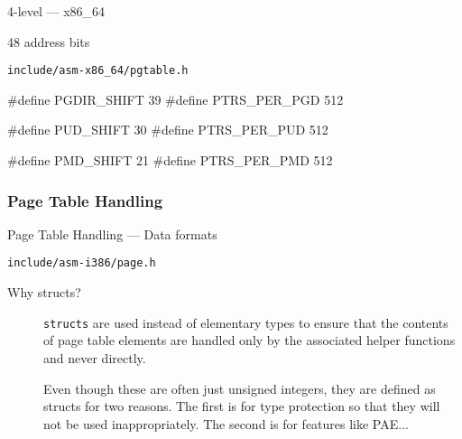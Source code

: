 \begin{frame}[fragile=singleslide]{4-level --- x86\_64}
  \begin{block}{48 address bits}
    \begin{center}
    \end{center}
  \end{block}
  \begin{block}{\texttt{include/asm-x86\_64/pgtable.h}}
    \begin{center}
\begin{ccode}
#define PGDIR_SHIFT  39
#define PTRS_PER_PGD 512

#define PUD_SHIFT    30
#define PTRS_PER_PUD 512

#define PMD_SHIFT    21
#define PTRS_PER_PMD 512
\end{ccode}
    \end{center}
  \end{block}
\end{frame}

\subsubsection{Page Table Handling}

\begin{frame}{Page Table Handling}{ --- Data formats}
  \begin{block}{\texttt{include/asm-i386/page.h}}
    \begin{center}
    \end{center}
  \end{block}
\end{frame}

\begin{description}
\item[Why structs?]  \texttt{structs} are used
  instead of elementary types to ensure that the contents of page table elements are
  handled only by the associated helper functions and never directly.
  
   Even
  though these are often just unsigned integers, they are defined as structs for two
  reasons. The first is for type protection so that they will not be used
  inappropriately. The second is for features like PAE...
\end{description}

